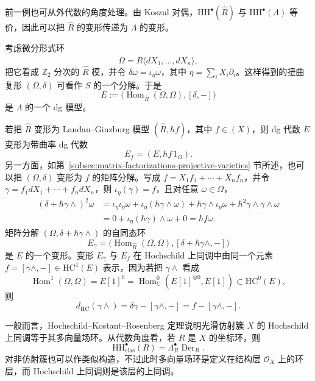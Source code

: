 \begin{example}[由矩阵分解得到的变形]
前一例也可从外代数的角度处理。由 Koszul 对偶，$\mathrm{HH}^{\bullet}(\widehat R)$ 与 $\mathrm{HH}^{\bullet}(\Lambda)$ 等价，因此可以把 $\widehat R$ 的变形传递为 $\Lambda$ 的变形。

考虑微分形式环
\[
  \Omega=\widehat R\langle dX_1,\ldots,dX_n\rangle,
\]
把它看成 $\mathbb Z_2$ 分次的 $\widehat R$ 模，并令 $\delta\omega=\iota_\eta\omega$，其中 $\eta=\sum_i X_i\partial_i$。这样得到的扭曲复形 $(\Omega,\delta)$ 可看作 $S$ 的一个分解。于是
\[
  E:=\bigl(\operatorname{Hom}_{\widehat R}(\Omega,\Omega),[\delta,-]\bigr)
\]
是 $\Lambda$ 的一个 dg 模型。

若把 $\widehat R$ 变形为 Landau--Ginzburg 模型 $(\widehat R,\hbar f)$，其中 $f\in(X)$，则 dg 代数 $E$ 变形为带曲率 dg 代数
\[
  E_f=(E,\hbar f\,1_\Omega).
\]
另一方面，如第~\ref{subsec:matrix-factorizations-projective-varieties} 节所述，也可以把 $(\Omega,\delta)$ 变形为 $f$ 的矩阵分解。写成 $f=X_1f_1+\cdots+X_nf_n$，并令 $\gamma=f_1dX_1+\cdots+f_ndX_n$，则 $\iota_\eta(\gamma)=f$，且对任意 $\omega\in\Omega$，
\begin{align*}
  (\delta+\hbar\gamma\wedge)^2\omega
  &=\iota_\eta\iota_\eta\omega+\iota_\eta(\hbar\gamma\wedge\omega)
    +\hbar\gamma\wedge\iota_\eta\omega+\hbar^2\gamma\wedge\gamma\wedge\omega\\
  &=0+\iota_\eta(\hbar\gamma)\wedge\omega+0
   =\hbar f\omega.
\end{align*}
矩阵分解 $(\Omega,\delta+\hbar\gamma\wedge)$ 的自同态环
\[
  E_\gamma=\bigl(\operatorname{Hom}_{\widehat R}(\Omega,\Omega),[\delta+\hbar\gamma\wedge,-]\bigr)
\]
是 $E$ 的一个变形。变形 $E_\gamma$ 与 $E_f$ 在 Hochschild 上同调中由同一个元素 $f=[\gamma\wedge,-]\in\mathrm{HC}^{1}(E)$ 表示，因为若把 $\gamma\wedge$ 看成
\[
  \operatorname{Hom}^{1}(\Omega,\Omega)=E[1]^0
  =\operatorname{Hom}^{0}_{\mathbb C}(E[1]^{\otimes0},E[1])\subset\mathrm{HC}^{0}(E),
\]
则
\[
  d_{\mathrm{HC}}(\gamma\wedge)=\delta\gamma-[\gamma\wedge,-]=f-[\gamma\wedge,-].
\]
\end{example}

\begin{note}
一般而言，Hochschild--Kostant--Rosenberg 定理说明光滑仿射簇 $X$ 的 Hochschild 上同调等于其多向量场环。从代数角度看，若 $R$ 是 $X$ 的坐标环，则
\[
  \mathrm{HH}^{\bullet}_{\mathrm{clas}}(R)=\Lambda_R^{\bullet}\operatorname{Der}_R.
\]
对非仿射簇也可以作类似构造，不过此时多向量场环是定义在结构层 $\mathcal O_X$ 上的环层，而 Hochschild 上同调则是该层的上同调。
\end{note}

